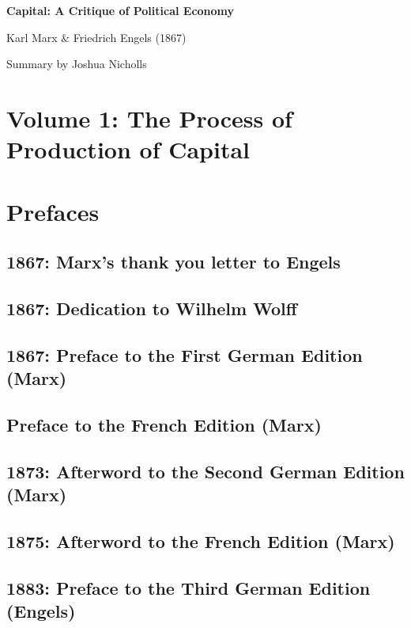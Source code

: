\documentclass{article}
\begin{document}
\begin{titlepage}
  \centering
  \vspace*{2cm}
  {\Huge\bfseries Capital: A Critique of Political Economy \par}
  \vspace{1cm}
  {\Large Karl Marx \& Friedrich Engels (1867)\par}
  \vfill
  {\large Summary by Joshua Nicholls\par}
  \vspace*{2cm}
\end{titlepage}

\section*{Volume 1: The Process of Production of Capital}

\section*{Prefaces}
\subsection*{1867: Marx’s thank you letter to Engels}
\subsection*{1867: Dedication to Wilhelm Wolff}
\subsection*{1867: Preface to the First German Edition (Marx)}
\subsection*{Preface to the French Edition (Marx)}
\subsection*{1873: Afterword to the Second German Edition (Marx)}
\subsection*{1875: Afterword to the French Edition (Marx)}
\subsection*{1883: Preface to the Third German Edition (Engels)}
\end{document}
